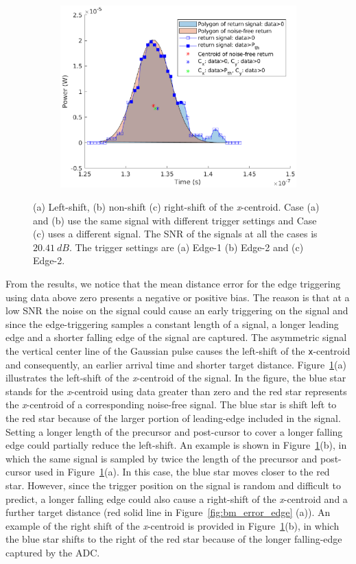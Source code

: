 \begin{figure}[t!p]
    \begin{subfigure}{.7\textwidth}
    \centering
    \includegraphics[width=.8\textwidth]{figures/chapter6_ADC/centroid_edge2_d_20_snr20_41_id131.eps}
    \end{subfigure}
    \caption{(a) Left-shift, (b) non-shift (c) right-shift of the \textit{x}-centroid. Case (a) and (b) use the same signal with different trigger settings and Case (c) uses a different signal. The SNR of the signals at all the cases is $20.41~dB$. The trigger settings are (a) Edge-1 (b) Edge-2 and (c) Edge-2.}
     \label{fig:bm_shift}
\end{figure}
From the results, we notice that the mean distance error for the edge triggering using data above zero presents a negative or positive bias. The reason is that at a low SNR the noise on the signal could cause an early triggering on the signal and since the edge-triggering samples a constant length of a signal, a longer leading edge and a shorter falling edge of the signal are captured. The asymmetric signal \wrt the vertical center line of the Gaussian pulse causes the left-shift of the \texttt{x}-centroid and consequently, an earlier arrival time and shorter target distance. Figure~\ref{fig:bm_shift}(a) illustrates the left-shift of the \textit{x}-centroid of the signal. In the figure, the blue star stands for the \textit{x}-centroid using data greater than zero and the red star represents the \textit{x}-centroid of a corresponding noise-free signal. The blue star is shift left to the red star because of the larger portion of leading-edge included in the signal. Setting a longer length of the precursor and post-cursor to cover a longer falling edge could partially reduce the left-shift. An example is shown in Figure~\ref{fig:bm_shift}(b), in which the same signal is sampled by twice the length of the precursor and post-cursor used in Figure~\ref{fig:bm_shift}(a). In this case, the blue star moves closer to the red star. However, since the trigger position on the signal is random and difficult to predict, a longer falling edge could also cause a right-shift of the \textit{x}-centroid and a further target distance (red solid line in Figure~\ref{fig:bm_error_edge} (a)). An example of the right shift of the \textit{x}-centroid is provided in Figure~\ref{fig:bm_shift}(b), in which the blue star shifts to the right of the red star because of the longer falling-edge captured by the ADC.\par
